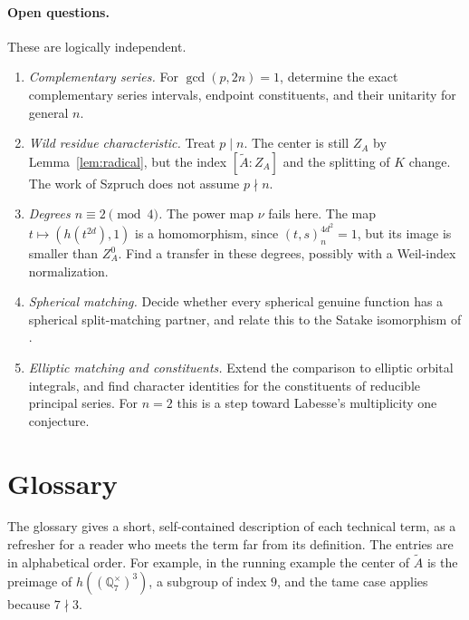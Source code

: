 \documentclass[12pt,letterpaper]{article}
\numberwithin{equation}{section}
\theoremstyle{plain}
\theoremstyle{definition}
\theoremstyle{remark}
\newcommand{\At}{\widetilde A}
\newcommand{\Qq}{\mathbb Q}
\newcommand{\ZA}{Z_A}
\begin{document}
\paragraph{Open questions.} These are logically independent.
\begin{enumerate}[label=(\arabic*),leftmargin=*]
\item \emph{Complementary series.} For $\gcd(p,2n)=1$, determine the
  exact complementary series intervals, endpoint constituents, and
  their unitarity for general $n$.
\item \emph{Wild residue characteristic.} Treat $p\mid n$. The center is
  still $\ZA$ by Lemma~\ref{lem:radical}, but the index $[\At:\ZA]$ and
  the splitting of $K$ change. The work of Szpruch \cite{Sz19,Sz25} does
  not assume $p\nmid n$.
\item \emph{Degrees $n\equiv2\pmod4$.} The power map $\nu$ fails here.
  The map $t\mapsto(h(t^{2d}),1)$ is a homomorphism, since
  $(t,s)_n^{4d^2}=1$, but its image is smaller than $\ZA^0$. Find a
  transfer in these degrees, possibly with a Weil-index normalization.
\item \emph{Spherical matching.} Decide whether every spherical genuine
  function has a spherical split-matching partner, and relate this to
  the Satake isomorphism of \cite{Mc12}.
\item \emph{Elliptic matching and constituents.} Extend the comparison
  to elliptic orbital integrals, and find character identities for the
  constituents of reducible principal series. For $n=2$ this is a
  step toward Labesse's multiplicity one conjecture.
\end{enumerate}

\section{Glossary}\label{sec:glossary}

The glossary gives a short, self-contained description of each
technical term, as a refresher for a reader who meets the term far from
its definition. The entries are in alphabetical order. For example, in
the running example the center of $\At$ is the preimage of
$h((\Qq_7^\times)^3)$, a subgroup of index $9$, and the tame case
applies because $7\nmid3$.
\end{document}
